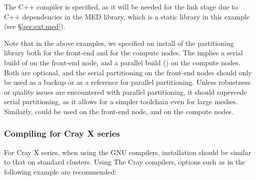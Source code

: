 \documentclass[a4paper,10pt,twoside]{csshortdoc}
\begin{document}
The C++ compiler is specified, as it will be needed for
the link stage due to C++ dependencies in the MED library,
which is a static library in this example (see \S\ref{sec:ext:med}).

Note that in the above examples, we specified an install of the \scotch
partitioning library both for the front-end and for the compute nodes.
The implies a serial build of \scotch on the front-end node, and a parallel
build (\ptscotch) on the compute nodes. Both are optional, and the
serial partitioning on the front-end nodes should only be used as a
backup or as a reference for parallel partitioning. Unless robustness
or quality issues are encountered with parallel partitioning, it
should supercede serial partitioning, as it allows for a simpler
toolchain even for large meshes.
Similarly, \metis could be used on the front-end node, and \parmetis
on the compute nodes.

\subsubsection{Compiling for Cray X series}

For Cray X series, when using the GNU compilers, installation should
be similar to that on standard clusters. Using The Cray compilers,
options such as in the following example are recommended:

\end{document}
